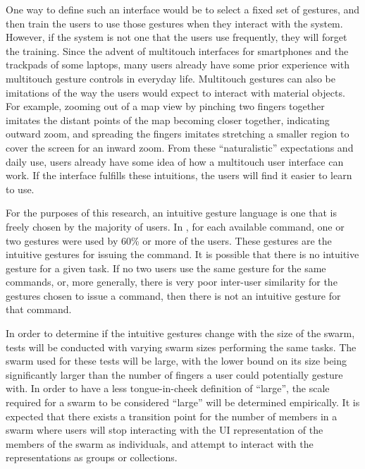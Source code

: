 One way to define such an interface would be to select a fixed set of gestures, and then train the users to use those gestures when they interact with the system. 
However, if the system is not one that the users use frequently, they will forget the training. 
Since the advent of multitouch interfaces for smartphones and the trackpads of some laptops, many users already have some prior experience with multitouch gesture controls in everyday life. 
Multitouch gestures can also be imitations of the way the users would expect to interact with material objects. 
For example, zooming out of a map view by pinching two fingers together imitates the distant points of the map becoming closer together, indicating outward zoom, and spreading the fingers imitates stretching a smaller region to cover the screen for an inward zoom. 
From these ``naturalistic'' expectations and daily use, users already have some idea of how a multitouch user interface can work. 
If the interface fulfills these intuitions, the users will find it easier to learn to use. 

For the purposes of this research, an intuitive gesture language is one that is freely chosen by the majority of users. 
In \citep{Micire:2009:ANG:1731903.1731912}, for each available command, one or two gestures were used by 60\% or more of the users. 
These gestures are the intuitive gestures for issuing the command. 
It is possible that there is no intuitive gesture for a given task.
If no two users use the same gesture for the same commands, or, more generally, there is very poor inter-user similarity for the gestures chosen to issue a command, then there is not an intuitive gesture for that command.

In order to determine if the intuitive gestures change with the size of the swarm, tests will be conducted with varying swarm sizes performing the same tasks. 
The swarm used for these tests will be large, with the lower bound on its size being significantly larger than the number of fingers a user could potentially gesture with. 
In order to have a less tongue-in-cheek definition of ``large'', the scale required for a swarm to be considered ``large'' will be determined empirically.
It is expected that there exists a transition point for the number of members in a swarm where users will stop interacting with the UI representation of the members of the swarm as individuals, and attempt to interact with the representations as groups or collections. 


